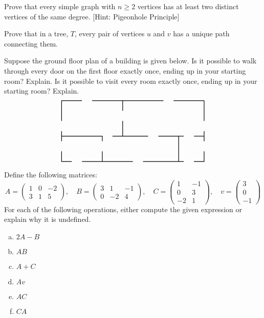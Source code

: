 \documentclass[11pt,letterpaper]{article}
\begin{document}
\newpage





 Prove that every simple graph with $n \geq 2$ vertices has at least two distinct vertices of the same degree. [Hint: Pigeonhole Principle]  \pspace





\newpage





 Prove that in a tree, $T$, every pair of vertices $u$ and $v$ has a unique path connecting them. \pspace





\newpage





 Suppose the ground floor plan of a building is given below. Is it possible to walk through every door on the first floor exactly once, ending up in your starting room? Explain. Is it possible to visit every room exactly once, ending up in your starting room? Explain. \pspace 
	\[
	\graphSix
	\] \pspace





\newpage





 Define the following matrices:
	\[
	A= \begin{pmatrix} 1 & 0 & -2 \\ 3 & 1 & 5 \end{pmatrix}, \quad
	B= \begin{pmatrix} 3 & 1 & -1 \\	0 & -2 & 4 \end{pmatrix}, \quad
	C= \begin{pmatrix} 1 & -1 \\ 0 & 3 \\ -2 & 1 \end{pmatrix}, \quad
	v= \begin{pmatrix} 3 \\ 0 \\-1\end{pmatrix}
	\]
For each of the following operations, either compute the given expression or explain why it is undefined. 

\begin{enumerate}[(a)]
\item $2A - B$
\item $AB$
\item $A + C$
\item $Av$
\item $AC$
\item $CA$
\end{enumerate} \pspace
\end{document}
